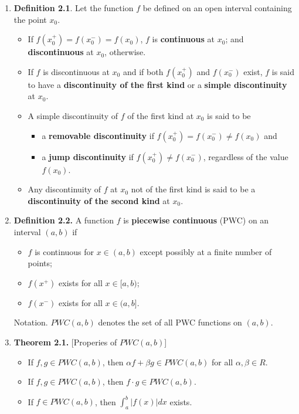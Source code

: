 \begin{enumerate}

\item \textbf{Definition 2.1}. Let the function $f$ be defined on an open interval containing the
point $x_0$.
\begin{itemize}
\item[(i)] If $f (x^{ +}_{0} ) = f (x ^{-}_{0} ) = f (x _{0} )$, $f$ is \textbf{continuous} at $x _{0}$; and \textbf{discontinuous} at $x _{0}$, otherwise.

\item[(ii)] If $f$ is discontinuous at $x _{0}$ and if both $f (x ^{+}_{0} )$ and $f (x ^{-}_{0} )$ exist, $f$ is said to have a \textbf{discontinuity of the first kind} or a \textbf{simple discontinuity} at $x _{0}$.

\item[(iii)] A simple discontinuity of $f$ of the first kind at $x _{0}$ is said to be
\begin{itemize}

    \item[(a)] a \textbf{removable discontinuity} if $f (x ^{+}
_{0} ) = f (x ^{-}_{0} ) \neq f (x _{0} )$ and

    \item[(b)] a \textbf{jump discontinuity} if $f (x ^{+}_{0} ) \neq f (x^{-} _{0} )$, regardless of the value $f (x _{0} )$.

\end{itemize}

\item[(iv)] Any discontinuity of $f$ at $x _{0}$ not of the first kind is said to be a \textbf{discontinuity of the second kind} at $x _{0}$.
\end{itemize}

\item \textbf{Definition 2.2.} A function $f$ is \textbf{piecewise continuous} (PWC) on an interval $(a, b)$ if
\begin{itemize}
\item[(i)] $f$ is continuous for $x \in (a, b)$ except possibly at a finite number of points;
\item[(ii)] $f (x ^{+} )$ exists for all $x \in [a, b)$;
\item[(iii)] $f (x ^{-} )$ exists for all $x \in (a, b]$.
\end{itemize}

Notation. $PWC(a, b)$ denotes the set of all PWC functions on $(a, b)$.

\item \textbf{Theorem 2.1.} [Properies of $PWC(a, b)$]
\begin{itemize}
\item[(i)] If $f, g \in PWC(a, b)$, then $\alpha f + \beta g ∈ PWC(a, b)$ for all $\alpha, \beta \in R$.
\item[(ii)] If $f, g \in PWC(a, b)$, then $f \cdot g \in PWC(a, b)$.
\item[(iii)] If $f \in PWC(a, b)$, then
$\int_{a}^{b}|f(x)|dx$ exists.
\end{itemize}



\end{enumerate}
